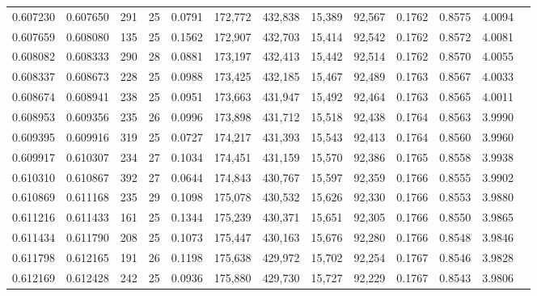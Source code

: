 \begin{tabular}{rrrrrrrrrrrrr}
0.607230 & 0.607650 &   291 &  25 &                                     0.0791 & 172,772 & 432,838 &  15,389 &  92,567 & 0.1762 & 0.8575 & 4.0094 \\
0.607659 & 0.608080 &   135 &  25 &                                     0.1562 & 172,907 & 432,703 &  15,414 &  92,542 & 0.1762 & 0.8572 & 4.0081 \\
0.608082 & 0.608333 &   290 &  28 &                                     0.0881 & 173,197 & 432,413 &  15,442 &  92,514 & 0.1762 & 0.8570 & 4.0055 \\
0.608337 & 0.608673 &   228 &  25 &                                     0.0988 & 173,425 & 432,185 &  15,467 &  92,489 & 0.1763 & 0.8567 & 4.0033 \\
0.608674 & 0.608941 &   238 &  25 &                                     0.0951 & 173,663 & 431,947 &  15,492 &  92,464 & 0.1763 & 0.8565 & 4.0011 \\
0.608953 & 0.609356 &   235 &  26 &                                     0.0996 & 173,898 & 431,712 &  15,518 &  92,438 & 0.1764 & 0.8563 & 3.9990 \\
0.609395 & 0.609916 &   319 &  25 &                                     0.0727 & 174,217 & 431,393 &  15,543 &  92,413 & 0.1764 & 0.8560 & 3.9960 \\
0.609917 & 0.610307 &   234 &  27 &                                     0.1034 & 174,451 & 431,159 &  15,570 &  92,386 & 0.1765 & 0.8558 & 3.9938 \\
0.610310 & 0.610867 &   392 &  27 &                                     0.0644 & 174,843 & 430,767 &  15,597 &  92,359 & 0.1766 & 0.8555 & 3.9902 \\
0.610869 & 0.611168 &   235 &  29 &                                     0.1098 & 175,078 & 430,532 &  15,626 &  92,330 & 0.1766 & 0.8553 & 3.9880 \\
0.611216 & 0.611433 &   161 &  25 &                                     0.1344 & 175,239 & 430,371 &  15,651 &  92,305 & 0.1766 & 0.8550 & 3.9865 \\
0.611434 & 0.611790 &   208 &  25 &                                     0.1073 & 175,447 & 430,163 &  15,676 &  92,280 & 0.1766 & 0.8548 & 3.9846 \\
0.611798 & 0.612165 &   191 &  26 &                                     0.1198 & 175,638 & 429,972 &  15,702 &  92,254 & 0.1767 & 0.8546 & 3.9828 \\
0.612169 & 0.612428 &   242 &  25 &                                     0.0936 & 175,880 & 429,730 &  15,727 &  92,229 & 0.1767 & 0.8543 & 3.9806 \\

\end{tabular}
